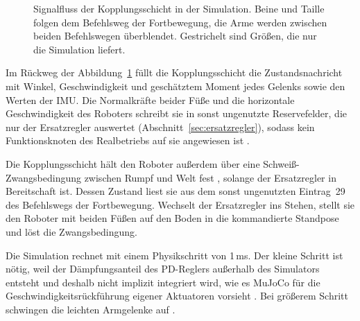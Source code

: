 \begin{figure}[htbp]
  \centering
  
  \caption[Signalfluss der Kopplungsschicht]{Signalfluss der Kopplungsschicht in der Simulation. Beine und Taille folgen dem Befehlsweg der Fortbewegung, die Arme werden zwischen beiden Befehlswegen überblendet. Gestrichelt sind Größen, die nur die Simulation liefert.}
  \label{fig:bridge}
\end{figure}

Im Rückweg der Abbildung~\ref{fig:bridge} füllt die Kopplungsschicht die Zustandsnachricht mit Winkel, Geschwindigkeit und geschätztem Moment jedes Gelenks sowie den Werten der IMU.
Die Normalkräfte beider Füße und die horizontale Geschwindigkeit des Roboters schreibt sie in sonst ungenutzte Reservefelder, die nur der Ersatzregler auswertet (Abschnitt~\ref{sec:ersatzregler}), sodass kein Funktionsknoten des Realbetriebs auf sie angewiesen ist .

Die Kopplungsschicht hält den Roboter außerdem über eine Schweiß-Zwangsbedingung zwischen Rumpf und Welt fest \cite{MujocoDoku2026}, solange der Ersatzregler in Bereitschaft ist.
Dessen Zustand liest sie aus dem sonst ungenutzten Eintrag~29 des Befehlswegs der Fortbewegung.
Wechselt der Ersatzregler ins Stehen, stellt sie den Roboter mit beiden Füßen auf den Boden in die kommandierte Standpose und löst die Zwangsbedingung.

\label{sec:zeitschritt}%
Die Simulation rechnet mit einem Physikschritt von 1\,ms.
Der kleine Schritt ist nötig, weil der Dämpfungsanteil des PD-Reglers außerhalb des Simulators entsteht und deshalb nicht implizit integriert wird, wie es MuJoCo für die Geschwindigkeitsrückführung eigener Aktuatoren vorsieht \cite{MujocoDoku2026b}.
Bei größerem Schritt schwingen die leichten Armgelenke auf .

